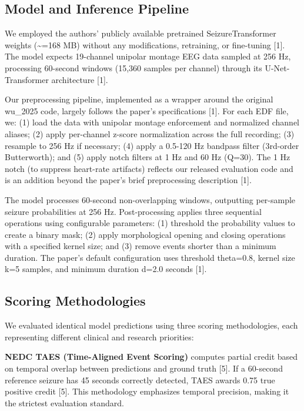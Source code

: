 \hypertarget{model-and-inference-pipeline}{%
\subsection{Model and Inference
Pipeline}\label{model-and-inference-pipeline}}

We employed the authors' publicly available pretrained
SeizureTransformer weights (\textasciitilde=168 MB) without any
modifications, retraining, or fine-tuning {[}1{]}. The model expects
19-channel unipolar montage EEG data sampled at 256 Hz, processing
60-second windows (15,360 samples per channel) through its
U-Net-Transformer architecture {[}1{]}.

Our preprocessing pipeline, implemented as a wrapper around the original
wu\_2025 code, largely follows the paper's specifications {[}1{]}. For
each EDF file, we: (1) load the data with unipolar montage enforcement
and normalized channel aliases; (2) apply per-channel z-score
normalization across the full recording; (3) resample to 256 Hz if
necessary; (4) apply a 0.5-120 Hz bandpass filter (3rd-order
Butterworth); and (5) apply notch filters at 1 Hz and 60 Hz (Q=30). The
1 Hz notch (to suppress heart-rate artifacts) reflects our released
evaluation code and is an addition beyond the paper's brief
preprocessing description {[}1{]}.

The model processes 60-second non-overlapping windows, outputting
per-sample seizure probabilities at 256 Hz. Post-processing applies
three sequential operations using configurable parameters: (1) threshold
the probability values to create a binary mask; (2) apply morphological
opening and closing operations with a specified kernel size; and (3)
remove events shorter than a minimum duration. The paper's default
configuration uses threshold theta=0.8, kernel size k=5 samples, and
minimum duration d=2.0 seconds {[}1{]}.

\hypertarget{scoring-methodologies}{%
\subsection{Scoring Methodologies}\label{scoring-methodologies}}

We evaluated identical model predictions using three scoring
methodologies, each representing different clinical and research
priorities:

\textbf{NEDC TAES (Time-Aligned Event Scoring)} computes partial credit
based on temporal overlap between predictions and ground truth {[}5{]}.
If a 60-second reference seizure has 45 seconds correctly detected, TAES
awards 0.75 true positive credit {[}5{]}. This methodology emphasizes
temporal precision, making it the strictest evaluation standard.

